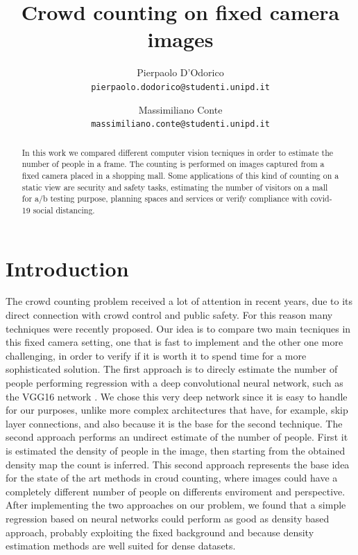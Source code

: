 \documentclass[10pt,twocolumn,letterpaper]{article}
\begin{document}
\title{Crowd counting on fixed camera images}

\author{Pierpaolo D'Odorico\\
{\tt\small pierpaolo.dodorico@studenti.unipd.it}
\and
Massimiliano Conte\\
{\tt\small massimiliano.conte@studenti.unipd.it}
}


\maketitle
\begin{abstract}



In this work we compared different computer vision tecniques in order to estimate the number of people in a frame. The counting is performed on images captured from a fixed camera placed in a shopping mall. Some applications of this kind of counting on a static view are security and safety tasks, estimating the number of visitors on a mall for a/b testing purpose, planning spaces and services or verify compliance with covid-19 social distancing.

\end{abstract}

\section{Introduction}

The crowd counting problem received a lot of attention in recent years, due to its direct connection with crowd control and public safety. For this reason many techniques were recently proposed.
Our idea is to compare two main tecniques in this fixed camera setting, one that is fast to implement and the other one more challenging, in order to verify if it is worth it to spend time for a more sophisticated solution. The first approach is to direcly estimate the number of people performing regression with a deep convolutional neural network, such as the VGG16 network \cite{simonyan2014very}. We chose this very deep network since it is easy to handle for our purposes, unlike more complex architectures that have, for example, skip layer connections, and also because it is the base for the second technique. The second approach performs an undirect estimate of the number of people. First it is estimated the density of people in the image, then starting from the obtained density map the count is inferred. This second approach represents the base idea for the state of the art methods in croud counting, where images could have a completely different number of people on  differents enviroment and perspective. After implementing the two approaches on our problem, we found that a simple regression based on neural networks could perform as good as density based approach, probably exploiting the fixed background and because density estimation methods are well suited for dense datasets.
\end{document}
